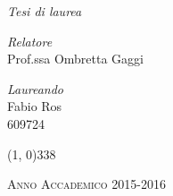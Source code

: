 \begin{titlepage}
\begin{center}
\begin{large}
\textsl{Tesi di laurea}\\
\end{large}

\vspace{40pt} 

\begin{large}
\begin{flushleft}
\textit{Relatore}\\ 
\vspace{5pt} 
Prof.ssa Ombretta Gaggi
\end{flushleft}

\vspace{0pt} 

\begin{flushright}
\textit{Laureando}\\ 
\vspace{5pt} 
Fabio Ros \\
609724
\end{flushright}
\end{large}

\vspace{40pt}

\line(1, 0){338} \\
\begin{normalsize}
\textsc{Anno Accademico 2015-2016}
\end{normalsize}

\end{center}
\end{titlepage}

%
